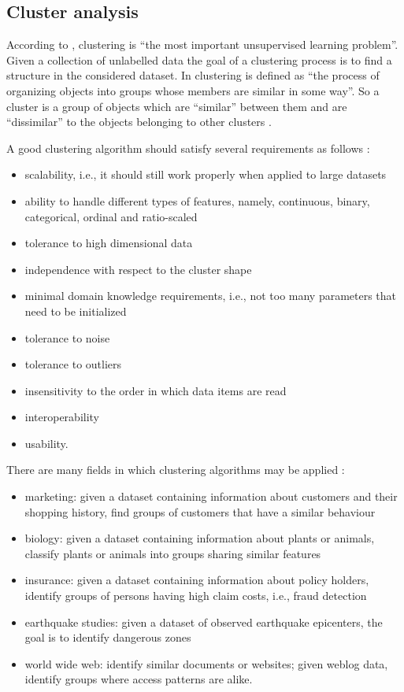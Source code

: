 \subsection{Cluster analysis}

According to \cite{website:clustering}, clustering is ``the most important unsupervised learning problem''. Given a collection of unlabelled data the goal of a clustering process is to find a structure in the considered dataset. In \cite{website:clustering} clustering is defined as ``the process of organizing objects into groups whose members are similar in some way''. So a cluster is a group of objects which are ``similar'' between them and are ``dissimilar'' to the objects belonging to other clusters \cite{website:clustering}.

A good clustering algorithm should satisfy several requirements as follows \cite{website:clustering}:

\begin{itemize}
\item scalability, i.e., it should still work properly when applied to large datasets
\item ability to handle different types of features, namely, continuous, binary, categorical, ordinal and ratio-scaled
\item tolerance to high dimensional data
\item independence with respect to the cluster shape
\item minimal domain knowledge requirements, i.e., not too many parameters that need to be initialized
\item tolerance to noise 
\item tolerance to outliers
\item insensitivity to the order in which data items are read
\item interoperability 
\item usability.
\end{itemize}

There are many fields  in which clustering algorithms may be applied \cite{website:clustering,Han06DataMining}:
\begin{itemize}
\item marketing: given a dataset containing information about customers and their shopping history, find groups of customers that have a similar behaviour
\item biology: given a dataset containing information about plants or animals, classify plants or animals into groups sharing similar features
\item insurance: given a dataset containing information about policy holders, identify groups of persons having high claim costs, i.e., fraud detection
\item earthquake studies: given a dataset of observed earthquake epicenters, the goal is to identify dangerous zones
\item world wide web: identify similar documents or websites; given weblog data, identify groups where access patterns are alike.
\end{itemize}


